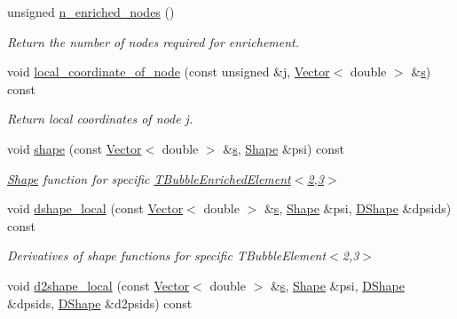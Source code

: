 \begin{DoxyCompactItemize}
\item 
unsigned \hyperlink{classoomph_1_1TBubbleEnrichedElementShape_3_012_00_013_01_4_a2d1fccdb7170138d34ffd78424fd6808}{n\+\_\+enriched\+\_\+nodes} ()
\begin{DoxyCompactList}\small\item\em Return the number of nodes required for enrichement. \end{DoxyCompactList}\item 
void \hyperlink{classoomph_1_1TBubbleEnrichedElementShape_3_012_00_013_01_4_a9dc70ccca180e2e00755ca906b774694}{local\+\_\+coordinate\+\_\+of\+\_\+node} (const unsigned \&j, \hyperlink{classoomph_1_1Vector}{Vector}$<$ double $>$ \&\hyperlink{cfortran_8h_ab7123126e4885ef647dd9c6e3807a21c}{s}) const
\begin{DoxyCompactList}\small\item\em Return local coordinates of node j. \end{DoxyCompactList}\item 
void \hyperlink{classoomph_1_1TBubbleEnrichedElementShape_3_012_00_013_01_4_a5833a6f8ef77a5b1999f64e5ff083816}{shape} (const \hyperlink{classoomph_1_1Vector}{Vector}$<$ double $>$ \&\hyperlink{cfortran_8h_ab7123126e4885ef647dd9c6e3807a21c}{s}, \hyperlink{classoomph_1_1Shape}{Shape} \&psi) const
\begin{DoxyCompactList}\small\item\em \hyperlink{classoomph_1_1Shape}{Shape} function for specific \hyperlink{classoomph_1_1TBubbleEnrichedElement}{T\+Bubble\+Enriched\+Element$<$2,3$>$} \end{DoxyCompactList}\item 
void \hyperlink{classoomph_1_1TBubbleEnrichedElementShape_3_012_00_013_01_4_a387669740bbba3fb6c8931c82290581f}{dshape\+\_\+local} (const \hyperlink{classoomph_1_1Vector}{Vector}$<$ double $>$ \&\hyperlink{cfortran_8h_ab7123126e4885ef647dd9c6e3807a21c}{s}, \hyperlink{classoomph_1_1Shape}{Shape} \&psi, \hyperlink{classoomph_1_1DShape}{D\+Shape} \&dpsids) const
\begin{DoxyCompactList}\small\item\em Derivatives of shape functions for specific T\+Bubble\+Element$<$2,3$>$ \end{DoxyCompactList}\item 
void \hyperlink{classoomph_1_1TBubbleEnrichedElementShape_3_012_00_013_01_4_a31ee07d9b89d6a8e6372f6a916c40de8}{d2shape\+\_\+local} (const \hyperlink{classoomph_1_1Vector}{Vector}$<$ double $>$ \&\hyperlink{cfortran_8h_ab7123126e4885ef647dd9c6e3807a21c}{s}, \hyperlink{classoomph_1_1Shape}{Shape} \&psi, \hyperlink{classoomph_1_1DShape}{D\+Shape} \&dpsids, \hyperlink{classoomph_1_1DShape}{D\+Shape} \&d2psids) const
\end{DoxyCompactItemize}


